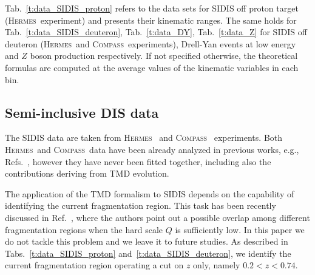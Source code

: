 \documentclass[aps,preprintnumbers,showpacs,nofootinbib,superscriptaddress,floatfix]{revtex4}
\newcommand{\hermes}{\textsc{Hermes}}
\newcommand{\compass}{\textsc{Compass}}
\begin{document}
Tab.~\ref{t:data_SIDIS_proton} refers to the data sets for SIDIS off proton target (\hermes\ experiment) and presents their kinematic ranges. 
The same holds for Tab.~\ref{t:data_SIDIS_deuteron}, Tab.~\ref{t:data_DY}, Tab.~\ref{t:data_Z} for SIDIS off deuteron (\hermes\ and \compass\ experiments), Drell-Yan events at low energy and $Z$ boson production respectively. 
If not specified otherwise, the theoretical formulas are computed at the
average values of the kinematic variables in each bin.

 
\subsection{Semi-inclusive DIS data}
\label{ss:SIDIS data}

The SIDIS data are taken from \hermes~\cite{Airapetian:2012ki} and \compass~\cite{Adolph:2013stb} experiments. 
Both \hermes\ and \compass\ data have been already analyzed in previous works,
e.g., Refs.~\cite{Signori:2013mda,Anselmino:2013lza}, 
however they have never been
fitted together, including also the contributions deriving from TMD
evolution. 

The application of the TMD formalism to SIDIS depends on the capability of
identifying the current fragmentation region. This task has been recently
discussed in Ref.~\cite{Boglione:2016bph}, where the authors point out a
possible overlap among different  fragmentation regions when the hard scale
$Q$ is sufficiently low.  
In this paper we do not tackle this problem and we leave it to future
studies. As described in Tabs.~\ref{t:data_SIDIS_proton}
and~\ref{t:data_SIDIS_deuteron}, we identify the current fragmentation region
operating a cut on $z$ only, namely $0.2 < z < 0.74$.
\end{document}
